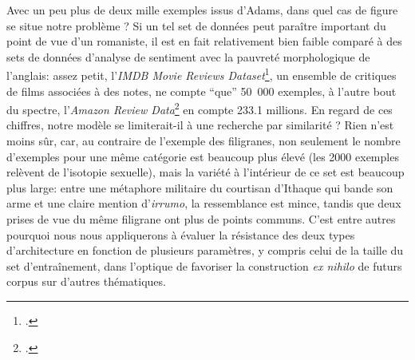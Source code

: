 Avec un peu plus de deux mille exemples issus d'Adams, dans quel cas de figure se situe notre problème ? Si un tel set de données peut paraître important du point de vue d'un romaniste, il est en fait relativement bien faible comparé à des sets de données d'analyse de sentiment avec la pauvreté morphologique de l'anglais: assez petit, l'\textit{IMDB Movie Reviews Dataset}\footcite{maas-EtAl:2011:ACL-HLT2011}, un ensemble de critiques de films associées à des notes, ne compte \enquote{que} 50~000 exemples, à l'autre bout du spectre, l'\textit{Amazon Review Data}\footcite{ni_justifying_2019} en compte 233.1 millions. En regard de ces chiffres, notre modèle se limiterait-il à une recherche par similarité ? Rien n'est moins sûr, car, au contraire de l'exemple des filigranes, non seulement le nombre d'exemples pour une même catégorie est beaucoup plus élevé (les 2000 exemples relèvent de l'isotopie sexuelle), mais la variété à l'intérieur de ce set est beaucoup plus large: entre une métaphore militaire du courtisan d'Ithaque qui bande son arme et une claire mention d'\textit{irrumo}, la ressemblance est mince, tandis que deux prises de vue du même filigrane ont plus de points communs. C'est entre autres pourquoi nous nous appliquerons à évaluer la résistance des deux types d'architecture en fonction de plusieurs paramètres, y compris celui de la taille du set d'entraînement, dans l'optique de favoriser la construction \textit{ex nihilo} de futurs corpus sur d'autres thématiques.


